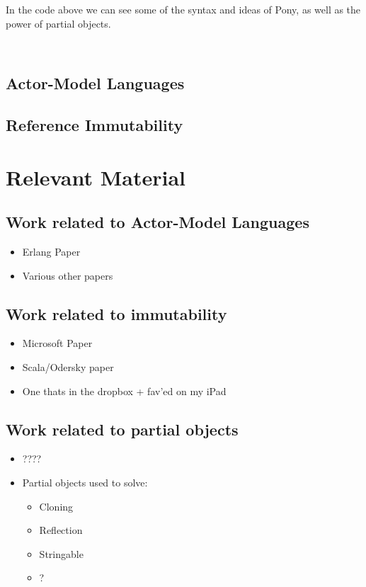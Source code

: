 \documentclass{article}
\begin{document}
In the code above we can see some of the syntax and ideas of Pony, as well as the power of partial objects.

\begin{verbatim}
    
\end{verbatim}

\subsection{Actor-Model Languages}
\subsection{Reference Immutability}
\label{sec:immutability}

\section{Relevant Material}

\subsection{Work related to Actor-Model Languages}

\begin{itemize}
	\item Erlang Paper
	\item Various other papers
\end{itemize}

\subsection{Work related to immutability}

\begin{itemize}
	\item Microsoft Paper
	\item Scala/Odersky paper
	\item One thats in the dropbox + fav'ed on my iPad
\end{itemize}

\subsection{Work related to partial objects}

\begin{itemize}
	\item ????
	\item Partial objects used to solve:
		\begin{itemize}
		\item Cloning
		\item Reflection
		\item Stringable
		\item ?
	\end{itemize}
	
\end{itemize}
\end{document}
